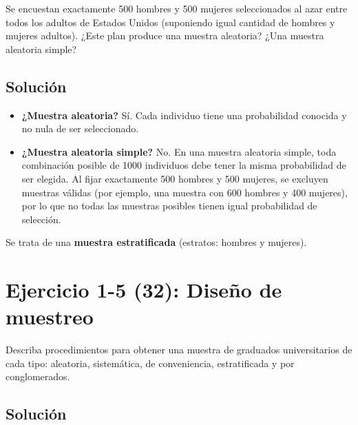\documentclass[a4paper]{article}
\begin{document}
Se encuestan exactamente 500 hombres y 500 mujeres seleccionados al azar entre todos los adultos de Estados Unidos (suponiendo igual cantidad de hombres y mujeres adultos). ¿Este plan produce una muestra aleatoria? ¿Una muestra aleatoria simple?

\subsection{Solución}

\begin{itemize}
    \item \textbf{¿Muestra aleatoria?} Sí. Cada individuo tiene una probabilidad conocida y no nula de ser seleccionado.
    \item \textbf{¿Muestra aleatoria simple?} No. En una muestra aleatoria simple, toda combinación posible de 1000 individuos debe tener la misma probabilidad de ser elegida. Al fijar exactamente 500 hombres y 500 mujeres, se excluyen muestras válidas (por ejemplo, una muestra con 600 hombres y 400 mujeres), por lo que no todas las muestras posibles tienen igual probabilidad de selección.
\end{itemize}

Se trata de una \textbf{muestra estratificada} (estratos: hombres y mujeres).

\section{Ejercicio 1-5 (32): Diseño de muestreo}

Describa procedimientos para obtener una muestra de graduados universitarios de cada tipo: aleatoria, sistemática, de conveniencia, estratificada y por conglomerados.

\subsection{Solución}
\end{document}
